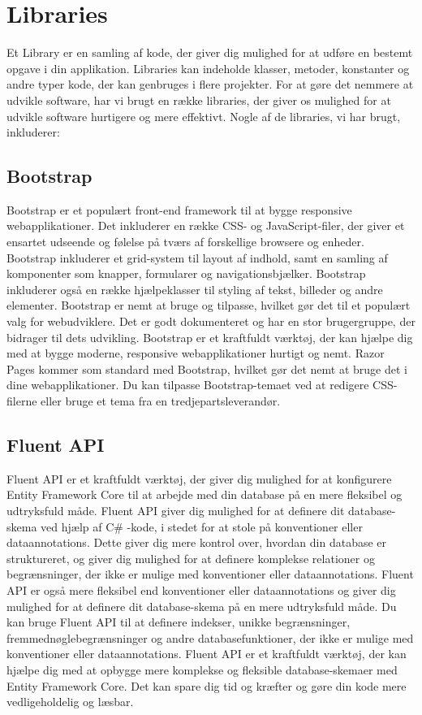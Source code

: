 \section{Libraries}
Et Library er en samling af kode, der giver dig mulighed for at udføre en bestemt opgave i din applikation. Libraries kan indeholde klasser, metoder, konstanter og andre typer kode, der kan genbruges i flere projekter.
For at gøre det nemmere at udvikle software, har vi brugt en række libraries, der giver os mulighed for at udvikle software hurtigere og mere effektivt. Nogle af de libraries, vi har brugt, inkluderer:

\subsection{Bootstrap}
Bootstrap er et populært front-end framework til at bygge responsive webapplikationer. Det inkluderer en række CSS- og JavaScript-filer, der giver et ensartet udseende og følelse på tværs af forskellige browsere og enheder.
Bootstrap inkluderer et grid-system til layout af indhold, samt en samling af komponenter som knapper, formularer og navigationsbjælker. Bootstrap inkluderer også en række hjælpeklasser til styling af tekst, billeder og andre elementer.
Bootstrap er nemt at bruge og tilpasse, hvilket gør det til et populært valg for webudviklere. Det er godt dokumenteret og har en stor brugergruppe, der bidrager til dets udvikling.
Bootstrap er et kraftfuldt værktøj, der kan hjælpe dig med at bygge moderne, responsive webapplikationer hurtigt og nemt.
Razor Pages kommer som standard med Bootstrap, hvilket gør det nemt at bruge det i dine webapplikationer. Du kan tilpasse Bootstrap-temaet ved at redigere CSS-filerne eller bruge et tema fra en tredjepartsleverandør.

\subsection{Fluent API}
Fluent API er et kraftfuldt værktøj, der giver dig mulighed for at konfigurere Entity Framework Core til at arbejde med din database på en mere fleksibel og udtryksfuld måde.
Fluent API giver dig mulighed for at definere dit database-skema ved hjælp af C\# -kode, i stedet for at stole på konventioner eller dataannotations. Dette giver dig mere kontrol over, hvordan din database er struktureret, og giver dig mulighed for at definere komplekse relationer og begrænsninger, der ikke er mulige med konventioner eller dataannotations.
Fluent API er også mere fleksibel end konventioner eller dataannotations og giver dig mulighed for at definere dit database-skema på en mere udtryksfuld måde. Du kan bruge Fluent API til at definere indekser, unikke begrænsninger, fremmednøglebegrænsninger og andre databasefunktioner, der ikke er mulige med konventioner eller dataannotations.
Fluent API er et kraftfuldt værktøj, der kan hjælpe dig med at opbygge mere komplekse og fleksible database-skemaer med Entity Framework Core. Det kan spare dig tid og kræfter og gøre din kode mere vedligeholdelig og læsbar.


